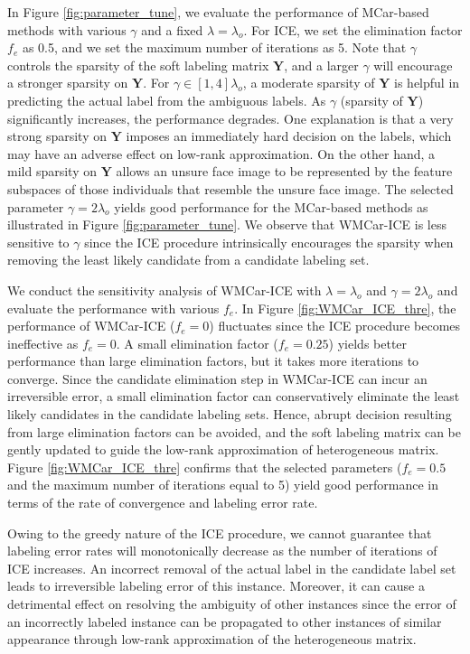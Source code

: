 \documentclass[10pt,journal,compsoc]{IEEEtran}
\begin{document}
In Figure \ref{fig:parameter_tune}, we evaluate the performance of MCar-based methods with various $\gamma$ and a fixed $\lambda = \lambda_o$. For ICE, we set the elimination factor $f_e$ as 0.5, and we set the maximum number of iterations as 5. Note that $\gamma$ controls the sparsity of the soft labeling matrix $\mathbf{Y}$, and a larger $\gamma$ will encourage a stronger sparsity on $\mathbf{Y}$. For $\gamma \in [1, 4]\lambda_o$, a moderate sparsity of $\mathbf{Y}$ is helpful in predicting the actual label from the ambiguous labels. As $\gamma$ (sparsity of $\mathbf{Y}$) significantly increases, the performance degrades. One explanation is that a very strong sparsity on $\mathbf{Y}$ imposes an immediately hard decision on the labels, which may have an adverse effect on low-rank approximation. On the other hand, a mild sparsity on $\mathbf{Y}$ allows an unsure face image to be represented by the feature subspaces of those individuals that resemble the unsure face image.
The selected parameter $\gamma = 2\lambda_o$ yields good performance for the MCar-based methods as illustrated in Figure \ref{fig:parameter_tune}.
We observe that WMCar-ICE is less sensitive to $\gamma$ since the ICE procedure intrinsically encourages the sparsity when removing the least likely candidate from a candidate labeling set.

We conduct the sensitivity analysis of WMCar-ICE with $\lambda = \lambda_o$ and $\gamma = 2\lambda_o$ and evaluate the performance with various $f_e$.
In Figure \ref{fig:WMCar_ICE_thre}, the performance of WMCar-ICE ($f_e = 0$) fluctuates since the ICE procedure becomes ineffective as $f_e = 0$. A small elimination factor ($f_e = 0.25$) yields better performance than large elimination factors, but it takes more iterations to converge. Since the candidate elimination step in WMCar-ICE can incur an irreversible error, a small elimination factor can conservatively eliminate the least likely candidates in the candidate labeling sets. Hence, abrupt decision resulting from large elimination factors can be avoided, and the soft labeling matrix can be gently updated to guide the low-rank approximation of heterogeneous matrix. Figure \ref{fig:WMCar_ICE_thre} confirms that the selected parameters ($f_e =0.5$ and the maximum number of iterations equal to 5) yield good performance in terms of the rate of convergence and labeling error rate.
  
Owing to the greedy nature of the ICE procedure, we cannot guarantee that labeling error rates will monotonically decrease as the number of iterations of ICE increases. An incorrect removal of the actual label in the candidate label set leads to irreversible labeling error of this instance. Moreover, it can cause a detrimental effect on resolving the ambiguity of other instances since the error of an incorrectly labeled instance can be propagated to other instances of similar appearance through low-rank approximation of the heterogeneous matrix.
\end{document}
